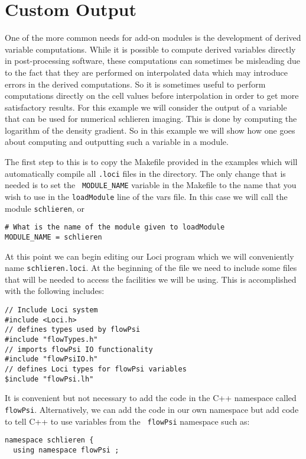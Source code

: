 \documentclass[letterpaper,twoside]{article}
\begin{document}
\clearpage
\section{Custom Output}

One of the more common needs for add-on modules is the development of
derived variable computations.  While it is possible to compute
derived variables directly in post-processing software, these
computations can sometimes be misleading due to the fact that they are
performed on interpolated data which may introduce errors in the
derived computations.  So it is sometimes useful to perform
computations directly on the cell values before interpolation in order
to get more satisfactory results.  For this example we will consider
the output of a variable that can be used for numerical schlieren
imaging.  This is done by computing the logarithm of the density
gradient.  So in this example we will show how one goes about
computing and outputting such a variable in a module.

The first step to this is to copy the Makefile provided in the
examples which will automatically compile all {\tt .loci} files in the
directory.  The only change that is needed is to set the {\tt
  MODULE\_NAME} variable in the Makefile to the name that you wish to
use in the {\tt loadModule} line of the vars file.  In this case we
will call the module {\tt schlieren}, or 
\begin{verbatim}
# What is the name of the module given to loadModule
MODULE_NAME = schlieren
\end{verbatim}

At this point we can begin editing our Loci program which we will
conveniently name {\tt schlieren.loci}.  At the beginning of the file
we need to include some files that will be needed to access the
facilities we will be using.  This is accomplished with the following 
includes:
\begin{verbatim}
// Include Loci system 
#include <Loci.h>
// defines types used by flowPsi
#include "flowTypes.h"
// imports flowPsi IO functionality
#include "flowPsiIO.h"
// defines Loci types for flowPsi variables
$include "flowPsi.lh"
\end{verbatim}

It is convenient but not necessary to add the code in the C++
namespace called {\tt flowPsi}.  Alternatively, we can add the code in our own
namespace but add code to tell C++ to use variables from the {\tt
  flowPsi} namespace such as:
\begin{verbatim}
namespace schlieren {
  using namespace flowPsi ;
\end{verbatim}
\end{document}
